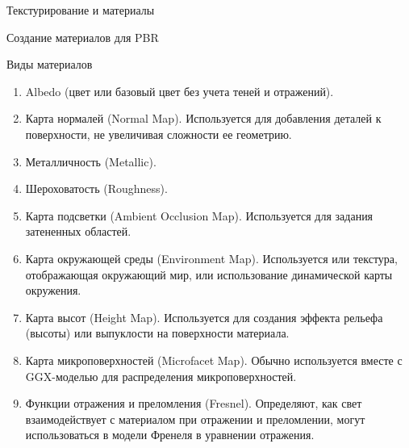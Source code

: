\documentclass{beamer}
\begin{document}
\begin{frame}{Текстурирование и материалы}
	\end{frame}

	\begin{frame}{Создание материалов для PBR}
		
		
		{
			\footnotesize
		Виды материалов

		\begin{enumerate}
			\item 
			Albedo (цвет или базовый цвет без учета теней и отражений).
			\item 
			Карта нормалей (Normal Map).
					Используется для добавления деталей к поверхности, не увеличивая сложности ее геометрию. 
			\item 
			Металличность (Metallic).
			\item 
			Шероховатость (Roughness).
			\item 
			Карта подсветки (Ambient Occlusion Map).
					Используется для задания затененных областей.
			\item 
					Карта окружающей среды (Environment Map).
							Используется или текстура, отображающая окружающий мир, или использование динамической карты окружения.
			\item
			Карта высот (Height Map).
					Используется для создания эффекта рельефа (высоты) или выпуклости на поверхности материала.
			\item
				Карта микроповерхностей (Microfacet Map).
				Обычно используется вместе с GGX-моделью для распределения микроповерхностей.
			\item
			Функции отражения и преломления (Fresnel).
			    Определяют, как свет взаимодействует с материалом при отражении и преломлении, могут использоваться в модели Френеля в уравнении отражения.
		\end{enumerate}
		
		}
		
	\end{frame}
\end{document}
